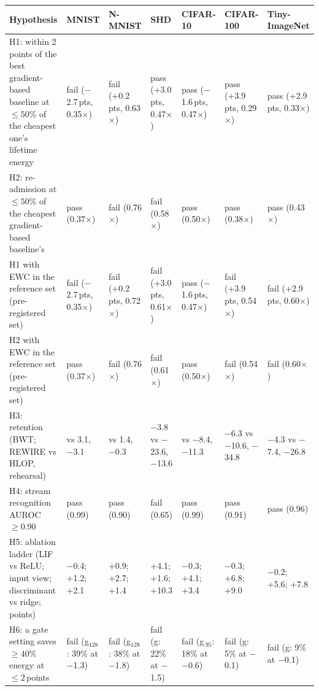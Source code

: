 \begin{tabular}{>{\raggedright\arraybackslash}p{}>{\raggedright\arraybackslash}p{}>{\raggedright\arraybackslash}p{}>{\raggedright\arraybackslash}p{}>{\raggedright\arraybackslash}p{}>{\raggedright\arraybackslash}p{}>{\raggedright\arraybackslash}p{}}
\toprule
Hypothesis & MNIST & N-MNIST & SHD & CIFAR-10 & CIFAR-100 & Tiny-ImageNet \\
\midrule
H1: within 2\,points of the best gradient-based baseline at $\le50\%$ of the cheapest one's lifetime energy & fail (\ensuremath{-}2.7\,pts, 0.35$\times$) & fail (+0.2\,pts, 0.63$\times$) & pass (+3.0\,pts, 0.47$\times$) & pass (\ensuremath{-}1.6\,pts, 0.47$\times$) & pass (+3.9\,pts, 0.29$\times$) & pass (+2.9\,pts, 0.33$\times$) \\
H2: re-admission at $\le50\%$ of the cheapest gradient-based baseline's & pass (0.37$\times$) & fail (0.76$\times$) & fail (0.58$\times$) & pass (0.50$\times$) & pass (0.38$\times$) & pass (0.43$\times$) \\
H1 with EWC in the reference set (pre-registered set) & fail (\ensuremath{-}2.7\,pts, 0.35$\times$) & fail (+0.2\,pts, 0.72$\times$) & fail (+3.0\,pts, 0.61$\times$) & pass (\ensuremath{-}1.6\,pts, 0.47$\times$) & fail (+3.9\,pts, 0.54$\times$) & fail (+2.9\,pts, 0.60$\times$) \\
H2 with EWC in the reference set (pre-registered set) & pass (0.37$\times$) & fail (0.76$\times$) & fail (0.61$\times$) & pass (0.50$\times$) & fail (0.54$\times$) & fail (0.60$\times$) \\
H3: retention (BWT; REWIRE vs HLOP, rehearsal) & 1.1 vs 3.1, \ensuremath{-}3.1 & 0.7 vs 1.4, \ensuremath{-}0.3 & \ensuremath{-}3.8 vs \ensuremath{-}23.6, \ensuremath{-}13.6 & 0.0 vs \ensuremath{-}8.4, \ensuremath{-}11.3 & \ensuremath{-}6.3 vs \ensuremath{-}10.6, \ensuremath{-}34.8 & \ensuremath{-}4.3 vs \ensuremath{-}7.4, \ensuremath{-}26.8 \\
H4: stream recognition AUROC $\ge0.90$ & pass (0.99) & pass (0.90) & fail (0.65) & pass (0.99) & pass (0.91) & pass (0.96) \\
H5: ablation ladder (LIF vs ReLU; input view; discriminant vs ridge; points) & \ensuremath{-}0.4; +1.2; +2.1 & +0.9; +2.7; +1.4 & +4.1; +1.6; +10.3 & \ensuremath{-}0.3; +4.1; +3.4 & \ensuremath{-}0.3; +6.8; +9.0 & \ensuremath{-}0.2; +5.6; +7.8 \\
H6: a gate setting saves $\ge40\%$ energy at $\le2$\,points & fail (g$_{128}$: 39\% at \ensuremath{-}1.3) & fail (g$_{128}$: 38\% at \ensuremath{-}1.8) & fail (g: 22\% at \ensuremath{-}1.5) & fail (g$_{.95}$: 18\% at \ensuremath{-}0.6) & fail (g: 5\% at \ensuremath{-}0.1) & fail (g: 9\% at \ensuremath{-}0.1) \\
\bottomrule
\end{tabular}
